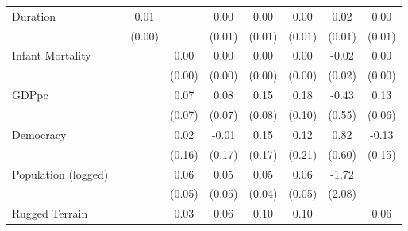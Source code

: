 \documentclass[12pt, letterpaper]{article}
\begin{document}
\begin{landscape}
\begin{table}[htbp]
\begin{small}
\begin{tabular}{l*{8}{c}}
Duration            &                     &        0.01         &                     &        0.00         &        0.00         &        0.00         &        0.02         &        0.00         \\
                    &                     &      (0.00)         &                     &      (0.01)         &      (0.01)         &      (0.01)         &      (0.01)         &      (0.01)         \\
Infant Mortality    &                     &                     &        0.00         &        0.00         &        0.00         &        0.00         &       -0.02         &        0.00         \\
                    &                     &                     &      (0.00)         &      (0.00)         &      (0.00)         &      (0.00)         &      (0.02)         &      (0.00)         \\
GDPpc               &                     &                     &        0.07         &        0.08         &        0.15\sym{*}  &        0.18\sym{*}  &       -0.43         &        0.13\sym{*}  \\
                    &                     &                     &      (0.07)         &      (0.07)         &      (0.08)         &      (0.10)         &      (0.55)         &      (0.06)         \\
Democracy           &                     &                     &        0.02         &       -0.01         &        0.15         &        0.12         &        0.82         &       -0.13         \\
                    &                     &                     &      (0.16)         &      (0.17)         &      (0.17)         &      (0.21)         &      (0.60)         &      (0.15)         \\
Population (logged) &                     &                     &        0.06         &        0.05         &        0.05         &        0.06         &       -1.72         &                     \\
                    &                     &                     &      (0.05)         &      (0.05)         &      (0.04)         &      (0.05)         &      (2.08)         &                     \\
Rugged Terrain      &                     &                     &        0.03         &        0.06         &        0.10\sym{**} &        0.10\sym{**} &                     &        0.06         \\

\end{tabular}
\end{small}
\end{table}
\end{landscape}
\end{document}
